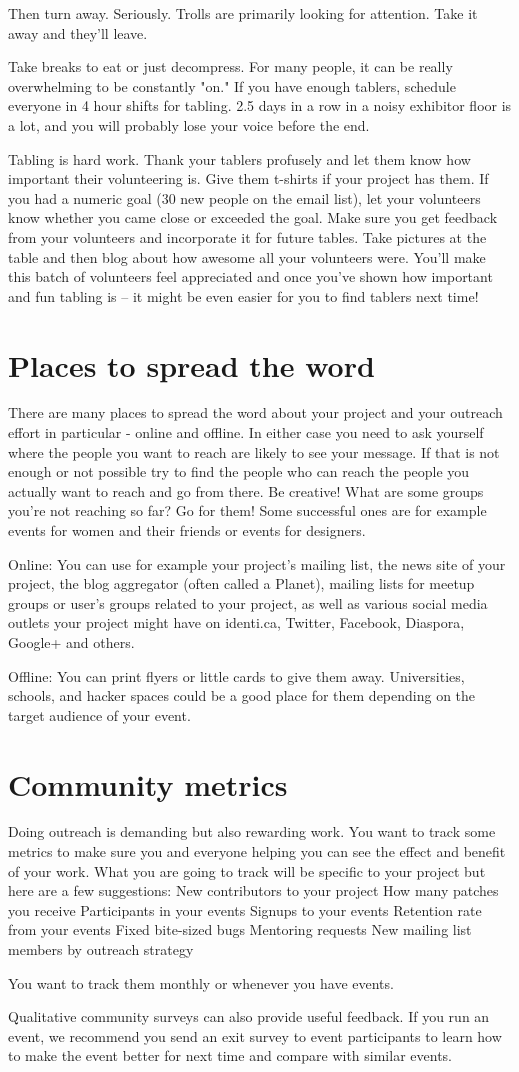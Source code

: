 Then turn away. Seriously. Trolls are primarily looking for attention. Take it away and they’ll leave. 

Take breaks to eat or just decompress. For many people, it can be really overwhelming to be constantly "on." If you have enough tablers, schedule everyone in 4 hour shifts for tabling. 2.5 days in a row in a noisy exhibitor floor is a lot, and you will probably lose your voice before the end.

Tabling is hard work. Thank your tablers profusely and let them know how important their volunteering  is. Give them t-shirts if your project has them. If you had a numeric goal (30 new people on the email list), let your volunteers know whether you came close or exceeded the goal. Make sure you get feedback from your volunteers and incorporate it for future tables. Take pictures at the table and then blog about how awesome all your volunteers were. You’ll make this batch of volunteers feel appreciated and once you’ve shown how important and fun tabling is --  it might be even easier for you to find tablers next time!

\section{Places to spread the word}
There are many places to spread the word about your project and your outreach effort in particular - online and offline. In either case you need to ask yourself where the people you want to reach are likely to see your message. If that is not enough or not possible try to find the people who can reach the people you actually want to reach and go from there. Be creative! What are some groups you’re not reaching so far? Go for them! Some successful ones are for example events for women and their friends or events for designers.

Online: You can use for example your project’s mailing list, the news site of your project, the blog aggregator (often called a Planet), mailing lists for meetup groups or user’s groups related to your project, as well as various social media outlets your project might have on identi.ca, Twitter, Facebook, Diaspora, Google+ and others.

Offline: You can print flyers or little cards to give them away. Universities, schools, and hacker spaces could be a good place for them depending on the target audience of your event.

\section{Community metrics}
Doing outreach is demanding but also rewarding work. You want to track some metrics to make sure you and everyone helping you can see the effect and benefit of your work. What you are going to track will be specific to your project but here are a few suggestions:
New contributors to your project
How many patches you receive
Participants in your events
Signups to your events
Retention rate from your events
Fixed bite-sized bugs
Mentoring requests
New mailing list members by outreach strategy

You want to track them monthly or whenever you have events.

Qualitative community surveys can also provide useful feedback. If you run an event, we recommend you send an exit survey to event participants to learn how to make the event better for next time and compare with similar events.
